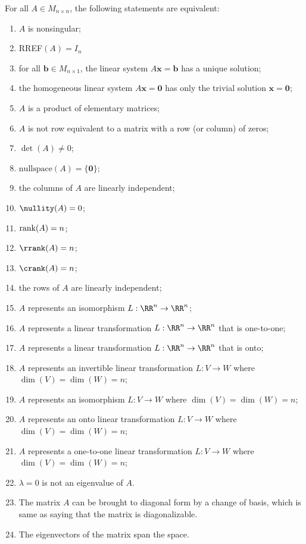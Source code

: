 \documentclass[main.tex]{subfiles}
\begin{document}
\noindent For all $A \in M_{n\times n}$, the following statements are equivalent:
\begin{enumerate}
\item\label{nonsing} $A$ is nonsingular;
\item\label{identity} RREF$(A) = I_n$
\item\label{unique solution} for all $\mathbf{b} \in M_{n\times 1}$, the linear system $A \mathbf{x} = \mathbf{b}$ has a unique solution;
\item\label{homogeneous} the homogeneous linear system $A \mathbf{x} = \mathbf{0}$ has only the trivial solution $\mathbf{x} = \mathbf{0}$;
\item\label{elementary} $A$ is a product of elementary matrices;
\item\label{no zero row} $A$ is not row equivalent to a matrix with a row (or column) of zeros;
\item\label{det nonzero} $\det(A) \not = 0$;
\item\label{null_space} $\mathrm{nullspace}(A) = \{\mathbf{0}\}$;
\item\label{cols A} the columns of $A$ are linearly independent;
\item\label{nullity A} $\nullity(A) = 0$;
\item\label{rank A} $\rank(A) = n$;
\item\label{row rank} $\rrank(A) = n$;
\item\label{col rank} $\crank(A) = n$;
\item\label{rows A} the rows of $A$ are linearly independent;
\item\label{isomorphism} $A$ represents an isomorphism $L:\RR^n \to \RR^n$;
\item\label{one-to-one} $A$ represents a linear transformation $L:\RR^n \to \RR^n$ that is one-to-one;
\item\label{onto} $A$ represents a linear transformation $L:\RR^n \to \RR^n$ that is onto;
\item \label{operator-invertible} $A$ represents an invertible linear transformation $L: V \to W$ where $\dim(V) = \dim(W) = n$;
\item \label{transf-iso} $A$ represents an isomorphism $L:V \to W$ where $\dim(V) = \dim(W) = n$;
\item \label{transf-onto} $A$ represents an onto linear transformation $L: V \to W$ where $\dim(V) = \dim(W) = n$;
\item \label{transf-one-to-one} $A$ represents a one-to-one linear transformation $L: V \to W$ where $\dim(V) = \dim(W) = n$;
\item \label{eigen} $\lambda = 0$ is not an eigenvalue of $A$.
\item The matrix $A$ can be brought to diagonal form by a change of basis, which is same as saying that the matrix is diagonalizable. 
\item The eigenvectors of the matrix span the space.  
\end{enumerate}
\end{document}
